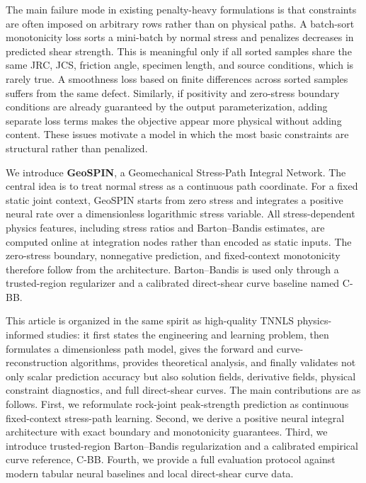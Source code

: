 \documentclass[journal]{IEEEtran}
\begin{document}
The main failure mode in existing penalty-heavy formulations is that constraints are often imposed on arbitrary rows rather than on physical paths. A batch-sort monotonicity loss sorts a mini-batch by normal stress and penalizes decreases in predicted shear strength. This is meaningful only if all sorted samples share the same JRC, JCS, friction angle, specimen length, and source conditions, which is rarely true. A smoothness loss based on finite differences across sorted samples suffers from the same defect. Similarly, if positivity and zero-stress boundary conditions are already guaranteed by the output parameterization, adding separate loss terms makes the objective appear more physical without adding content. These issues motivate a model in which the most basic constraints are structural rather than penalized.

We introduce \textbf{GeoSPIN}, a Geomechanical Stress-Path Integral Network. The central idea is to treat normal stress as a continuous path coordinate. For a fixed static joint context, GeoSPIN starts from zero stress and integrates a positive neural rate over a dimensionless logarithmic stress variable. All stress-dependent physics features, including stress ratios and Barton--Bandis estimates, are computed online at integration nodes rather than encoded as static inputs. The zero-stress boundary, nonnegative prediction, and fixed-context monotonicity therefore follow from the architecture. Barton--Bandis is used only through a trusted-region regularizer and a calibrated direct-shear curve baseline named C-BB.

This article is organized in the same spirit as high-quality TNNLS physics-informed studies: it first states the engineering and learning problem, then formulates a dimensionless path model, gives the forward and curve-reconstruction algorithms, provides theoretical analysis, and finally validates not only scalar prediction accuracy but also solution fields, derivative fields, physical constraint diagnostics, and full direct-shear curves. The main contributions are as follows. First, we reformulate rock-joint peak-strength prediction as continuous fixed-context stress-path learning. Second, we derive a positive neural integral architecture with exact boundary and monotonicity guarantees. Third, we introduce trusted-region Barton--Bandis regularization and a calibrated empirical curve reference, C-BB. Fourth, we provide a full evaluation protocol against modern tabular neural baselines and local direct-shear curve data.
\end{document}

